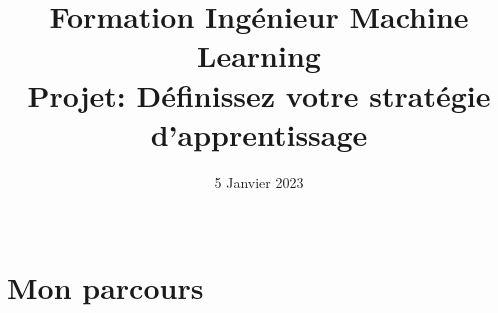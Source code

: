 \documentclass[8pt,xcolor=pdftex,table]{beamer}
\title[]{\vspace{22mm}Formation \alert{Ingénieur Machine Learning}\\\vspace{6mm}Projet: Définissez votre \alert{stratégie d'apprentissage}}
\date[]{5 Janvier 2023\\\vspace{18mm}\\\tit{thomas.durandtexte@protonmail.com}}
\begin{document}

\begin{frame}
	\titlepage{}
\end{frame}






\section{Mon \alert{parcours}}
\end{document}
